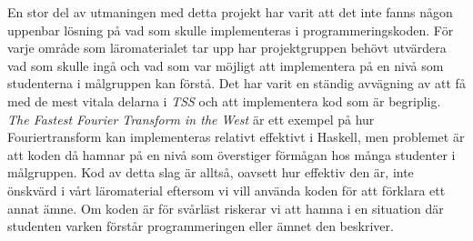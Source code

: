 \documentclass[12pt,a4paper,twoside,openright]{article}
\begin{document}


En stor del av utmaningen med detta projekt har varit att det inte
fanns någon uppenbar lösning på vad som skulle implementeras i
programmeringskoden. För varje område som läromaterialet tar upp har
projektgruppen behövt utvärdera vad som skulle ingå och vad som var
möjligt att implementera på en nivå som studenterna i målgruppen kan
förstå. Det har varit en ständig avvägning av att få med de mest
vitala delarna i \textit{TSS} och att implementera kod som är
begriplig. \textit{The Fastest Fourier Transform in the West}
\cite{fastestfourier} %
är ett exempel på hur Fouriertransform kan implementeras relativt
effektivt i Haskell, men problemet är att koden då hamnar på en nivå
som överstiger förmågan hos många studenter i målgruppen. Kod av detta
slag är alltså, oavsett hur effektiv den är, inte önskvärd i vårt
läromaterial eftersom vi vill använda koden för att förklara ett annat
ämne. Om koden är för svårläst riskerar vi att hamna i en situation
där studenten varken förstår programmeringen eller ämnet den
beskriver.
\end{document}
